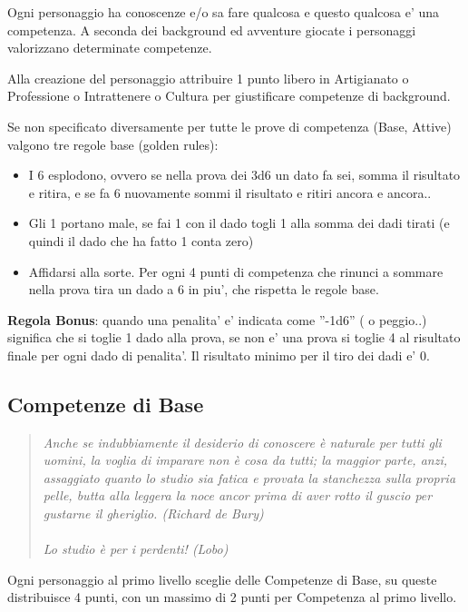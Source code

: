 \documentclass[a4paper,11pt,twoside,openany]{book}
\begin{document}
Ogni personaggio ha conoscenze e/o sa fare qualcosa e questo qualcosa e' una competenza. A seconda dei background ed avventure giocate i personaggi valorizzano determinate competenze.

Alla creazione del personaggio attribuire 1 punto libero in Artigianato o Professione o Intrattenere o Cultura per giustificare competenze di background.

Se non specificato diversamente per tutte le prove di competenza (Base, Attive) valgono tre regole base  (golden rules):

\begin{itemize}
\item 
I 6 esplodono, ovvero se nella prova dei 3d6 un dato fa sei, somma il risultato e ritira, e se fa 6 nuovamente sommi il risultato e ritiri ancora e ancora.. 
\item 
Gli 1 portano male, se fai 1 con il dado togli 1 alla somma dei dadi tirati (e quindi il dado che ha fatto 1 conta zero) 
\item 
Affidarsi alla sorte. Per ogni 4 punti di competenza che rinunci a sommare nella prova tira un dado a 6 in piu', che rispetta le regole base. 
\end{itemize}

\textbf{Regola Bonus}: quando una penalita' e' indicata come ''-1d6'' ( o peggio..) significa che si toglie 1 dado alla prova, se non e' una prova si toglie 4 al risultato finale per ogni dado di penalita'. Il risultato minimo per il tiro dei dadi e' 0.


\subsection{Competenze di Base}

\label{competenze-di-base}

\begin{quote}\textit{
Anche se indubbiamente il desiderio di conoscere è naturale per tutti gli uomini, la voglia di imparare non è cosa da tutti; la maggior parte, anzi, assaggiato quanto lo studio sia fatica e provata la stanchezza sulla propria pelle, butta alla leggera la noce ancor prima di aver rotto il guscio per gustarne il gheriglio. (Richard de Bury)\\\\
Lo studio è per i perdenti! (Lobo)
}\end{quote}

Ogni personaggio al primo livello sceglie delle Competenze di Base, su queste distribuisce 4 punti, con un massimo di 2 punti per Competenza al primo livello.
\end{document}
